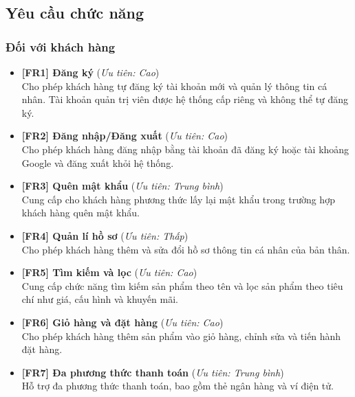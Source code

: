 \subsection{Yêu cầu chức năng}

 \subsubsection{Đối với khách hàng}

\begin{itemize}

\item \textbf{[FR1] Đăng ký} \hfill (\textit{Ưu tiên: Cao})\\
    Cho phép khách hàng tự đăng ký tài khoản mới và quản lý thông tin cá nhân. Tài khoản quản trị viên được hệ thống cấp riêng và không thể tự đăng ký.

\item \textbf{[FR2] Đăng nhập/Đăng xuất} \hfill (\textit{Ưu tiên: Cao})\\
    Cho phép khách hàng đăng nhập bằng tài khoản đã đăng ký hoặc tài khoảng Google và đăng xuất khỏi hệ thống.

\item \textbf{[FR3] Quên mật khẩu} \hfill (\textit{Ưu tiên: Trung bình})\\
    Cung cấp cho khách hàng phương thức lấy lại mật khẩu trong trường hợp khách hàng quên mật khẩu.

\item \textbf{[FR4] Quản lí hồ sơ} \hfill (\textit{Ưu tiên: Thấp})\\
    Cho phép khách hàng thêm và sửa đổi hồ sơ thông tin cá nhân của bản thân.

\item \textbf{[FR5] Tìm kiếm và lọc} \hfill (\textit{Ưu tiên: Cao})\\
    Cung cấp chức năng tìm kiếm sản phẩm theo tên và lọc sản phẩm theo tiêu chí như giá, cấu hình và khuyến mãi.

\item \textbf{[FR6] Giỏ hàng và đặt hàng} \hfill (\textit{Ưu tiên: Cao})\\
    Cho phép khách hàng thêm sản phẩm vào giỏ hàng, chỉnh sửa và tiến hành đặt hàng.

\item \textbf{[FR7] Đa phương thức thanh toán} \hfill (\textit{Ưu tiên: Trung bình})\\
    Hỗ trợ đa phương thức thanh toán, bao gồm thẻ ngân hàng và ví điện tử.


\end{itemize}
